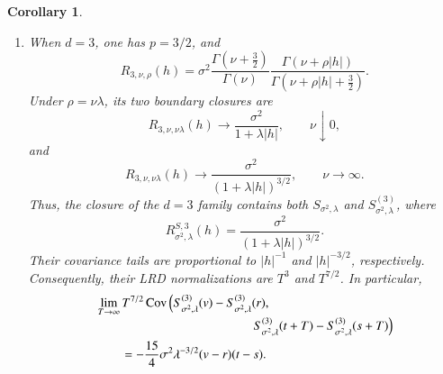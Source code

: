 \documentclass[preprint,12pt,authoryear]{elsarticle}
\newtheorem{cor}{Corollary}
\begin{document}
\begin{cor}
\begin{enumerate}
\item[(vii)]
When \(d=3\), one has \(p=3/2\), and
\begin{equation}\label{eq:stein-d3-covariance}
R_{3,\nu,\rho}(h)
=
\sigma^2
\frac{\Gamma\!\left(\nu+\frac32\right)}{\Gamma(\nu)}
\frac{\Gamma(\nu+\rho|h|)}
{\Gamma\!\left(\nu+\rho|h|+\frac32\right)}.
\end{equation}
Under \(\rho=\nu\lambda\), its two boundary closures are
\begin{equation}\label{eq:d3-small-nu}
R_{3,\nu,\nu\lambda}(h)
\longrightarrow
\frac{\sigma^2}{1+\lambda|h|},
\qquad \nu\downarrow0,
\end{equation}
and
\begin{equation}\label{eq:d3-large-nu}
R_{3,\nu,\nu\lambda}(h)
\longrightarrow
\frac{\sigma^2}{(1+\lambda|h|)^{3/2}},
\qquad \nu\to\infty.
\end{equation}
Thus, the closure of the \(d=3\) family contains both
\(S_{\sigma^2,\lambda}\) and \(S^{(3)}_{\sigma^2,\lambda}\), where
\begin{equation}\label{eq:S3-covariance}
R^{S,3}_{\sigma^2,\lambda}(h)
=
\frac{\sigma^2}{(1+\lambda|h|)^{3/2}}.
\end{equation}
Their covariance tails are proportional to \(|h|^{-1}\) and
\(|h|^{-3/2}\), respectively. Consequently, their LRD normalizations
are \(T^3\) and \(T^{7/2}\). In particular,
\begin{equation}\label{eq:S3-lrd-limit}
\begin{aligned}
&\lim_{T\to\infty}T^{7/2}
\operatorname{Cov}\left(
S^{(3)}_{\sigma^2,\lambda}(v)
-
S^{(3)}_{\sigma^2,\lambda}(r),
\right.\\[-1mm]
&\hspace{4.3cm}\left.
S^{(3)}_{\sigma^2,\lambda}(t+T)
-
S^{(3)}_{\sigma^2,\lambda}(s+T)
\right)\\
&\qquad
=
-\frac{15}{4}\sigma^2\lambda^{-3/2}
(v-r)(t-s).
\end{aligned}
\end{equation}
\end{enumerate}
\end{cor}
\end{document}
